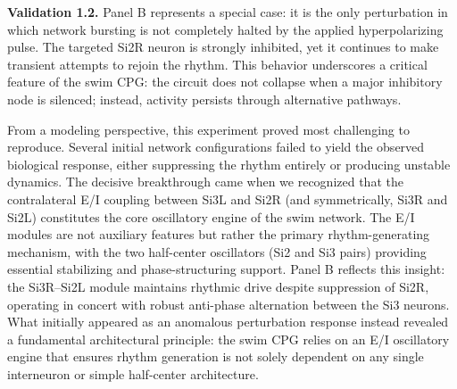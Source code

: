 \documentclass[nofootinbib,aip,amsmath,amssymb,preprint,twocolumn,floatfix,10pt]{revtex4-2}
\begin{document}

{\bf Validation 1.2.}
Panel B represents a special case: it is the only perturbation in which network bursting is not completely halted by the applied hyperpolarizing pulse. The targeted Si2R neuron is strongly inhibited, yet it continues to make transient attempts to rejoin the rhythm. This behavior underscores a critical feature of the swim CPG: the circuit does not collapse when a major inhibitory node is silenced; instead, activity persists through alternative pathways. 

From a modeling perspective, this experiment proved most challenging to reproduce. Several initial network configurations failed to yield the observed biological response, either suppressing the rhythm entirely or producing unstable dynamics. The decisive breakthrough came when we recognized that the contralateral E/I coupling between Si3L and Si2R (and symmetrically, Si3R and Si2L) constitutes the core oscillatory engine of the swim network. The E/I modules are not auxiliary features but rather the primary rhythm-generating mechanism, with the two half-center oscillators (Si2 and Si3 pairs) providing essential stabilizing and phase-structuring support. Panel B reflects this insight: the Si3R--Si2L module maintains rhythmic drive despite suppression of Si2R, operating in concert with robust anti-phase alternation between the Si3 neurons. What initially appeared as an anomalous perturbation response instead revealed a fundamental architectural principle: the swim CPG relies on an E/I oscillatory engine that ensures rhythm generation is not solely dependent on any single interneuron or simple half-center architecture.    
\end{document}
